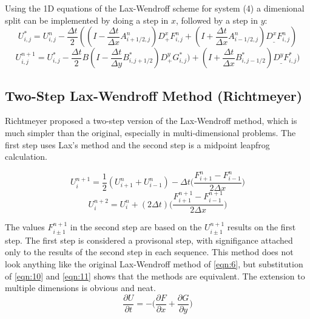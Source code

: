 Using the 1D equations of the Lax-Wendroff scheme for system (4) a dimenional split can be implemented by 
doing a step in $x$, followed by a step in $y$: 
\begin{equation}\label{eqn:6}
U_{i,j}^* = U_{i,j}^n - \frac{\Delta t}{2} (( I- \frac{\Delta t}{\Delta x} A_{i+1/2,j}^n ) D_+^xF_{i,j}^n + (I+ \frac{\Delta
t}{\Delta x} A_{i-1/2,j}^n) D_{\_}^xF_{i,j}^n)
\end{equation}
\begin{equation}\label{eqn:7}
U_{i,j}^{n+1} = U_{i,j}^* - \frac{\Delta t}{2} B(I - \frac{\Delta t}{\Delta y} B_{i,j+1/2}^*) D_+^yG_{i,j}^*) +(I + \frac{\Delta
t}{\Delta x} B_{i,j-1/2}^* ) D_{\_}^y F_{i,j}^* )
\end{equation}
\newline


\subsection{Two-Step Lax-Wendroff Method (Richtmeyer)}

Richtmeyer proposed a two-step version of the Lax-Wendroff method, which is much simpler than the original, especially in multi-dimensional problems.
The first step uses Lax's  method and the second step is a midpoint leapfrog calculation. 

\begin{equation}\label{eqn:8}
U_{i}^{n+1} = \frac{1}{2}(U_{i+1}^{n}+U_{i-1}^{n})-\Delta{t} \Big(\frac{F_{i+1}^{n}-F_{i-1}^{n}}{2\Delta x}\Big)
\end{equation}
\begin{equation}\label{eqn:9}
U_{i}^{n+2} = U_{i}^{n} + (2\Delta t) \Big ( \frac{ F_{i+1}^{n+1}-F_{i-1}^{n+1} }{ 2 \Delta x } \Big)
\end{equation} 
\newline

The values $F_{i \pm 1}^{n+1}$ in the second step are based on the $U_{i \pm 1}^{n+1}$ results on the first step. The first step is considered
a provisonal step, with signifigance attached only to the results of the second step in each sequence. This method does not look anything like the original
Lax-Wendroff method of \eqref{eqn:6}, but substitution of \eqref{eqn:10} and \eqref{eqn:11} shows that the methods are equivalent. 
\newline
The extension to multiple dimensions is obvious and neat.
\begin{equation}\label{eqn:10}
\frac{\partial U}{\partial t} = - \Big( \frac{\partial F}{\partial x} + \frac{\partial G}{\partial y} \Big)
\end{equation}

